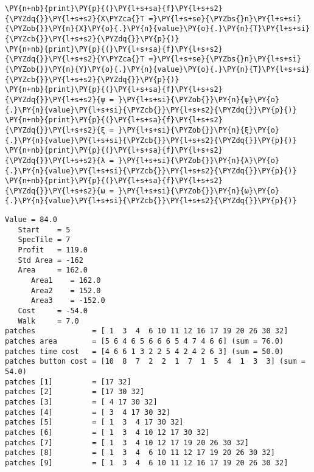 \begin{tcolorbox}[breakable, size=fbox, boxrule=1pt, pad at break*=1mm,colback=cellbackground, colframe=cellborder]
    \begin{Verbatim}[commandchars=\\\{\}]
\PY{n+nb}{print}\PY{p}{(}\PY{l+s+sa}{f}\PY{l+s+s2}{\PYZdq{}}\PY{l+s+s2}{X\PYZca{}T =}\PY{l+s+se}{\PYZbs{}n}\PY{l+s+si}{\PYZob{}}\PY{n}{X}\PY{o}{.}\PY{n}{value}\PY{o}{.}\PY{n}{T}\PY{l+s+si}{\PYZcb{}}\PY{l+s+s2}{\PYZdq{}}\PY{p}{)}
\PY{n+nb}{print}\PY{p}{(}\PY{l+s+sa}{f}\PY{l+s+s2}{\PYZdq{}}\PY{l+s+s2}{Y\PYZca{}T =}\PY{l+s+se}{\PYZbs{}n}\PY{l+s+si}{\PYZob{}}\PY{n}{Y}\PY{o}{.}\PY{n}{value}\PY{o}{.}\PY{n}{T}\PY{l+s+si}{\PYZcb{}}\PY{l+s+s2}{\PYZdq{}}\PY{p}{)}
\PY{n+nb}{print}\PY{p}{(}\PY{l+s+sa}{f}\PY{l+s+s2}{\PYZdq{}}\PY{l+s+s2}{ψ = }\PY{l+s+si}{\PYZob{}}\PY{n}{ψ}\PY{o}{.}\PY{n}{value}\PY{l+s+si}{\PYZcb{}}\PY{l+s+s2}{\PYZdq{}}\PY{p}{)}
\PY{n+nb}{print}\PY{p}{(}\PY{l+s+sa}{f}\PY{l+s+s2}{\PYZdq{}}\PY{l+s+s2}{ξ = }\PY{l+s+si}{\PYZob{}}\PY{n}{ξ}\PY{o}{.}\PY{n}{value}\PY{l+s+si}{\PYZcb{}}\PY{l+s+s2}{\PYZdq{}}\PY{p}{)}
\PY{n+nb}{print}\PY{p}{(}\PY{l+s+sa}{f}\PY{l+s+s2}{\PYZdq{}}\PY{l+s+s2}{λ = }\PY{l+s+si}{\PYZob{}}\PY{n}{λ}\PY{o}{.}\PY{n}{value}\PY{l+s+si}{\PYZcb{}}\PY{l+s+s2}{\PYZdq{}}\PY{p}{)}
\PY{n+nb}{print}\PY{p}{(}\PY{l+s+sa}{f}\PY{l+s+s2}{\PYZdq{}}\PY{l+s+s2}{ω = }\PY{l+s+si}{\PYZob{}}\PY{n}{ω}\PY{o}{.}\PY{n}{value}\PY{l+s+si}{\PYZcb{}}\PY{l+s+s2}{\PYZdq{}}\PY{p}{)}
    \end{Verbatim}
\end{tcolorbox}

\vspace*{-0.25cm}


\fontsize{8.75}{10.5}\selectfont %

\begin{Verbatim}[commandchars=\\\{\}]
Value = 84.0
   Start    = 5
   SpecTile = 7
   Profit   = 119.0
   Std Area = -162
   Area     = 162.0
      Area1    = 162.0
      Area2    = 152.0
      Area3    = -152.0
   Cost     = -54.0
   Walk     = 7.0
patches             = [ 1  3  4  6 10 11 12 16 17 19 20 26 30 32]
patches area        = [5 6 4 6 5 6 6 6 5 4 7 4 6 6] (sum = 76.0)
patches time cost   = [4 6 6 1 3 2 2 5 4 2 4 2 6 3] (sum = 50.0)
patches button cost = [10  8  7  2  2  1  7  1  5  4  1  3  3] (sum = 54.0)
patches [1]         = [17 32]
patches [2]         = [17 30 32]
patches [3]         = [ 4 17 30 32]
patches [4]         = [ 3  4 17 30 32]
patches [5]         = [ 1  3  4 17 30 32]
patches [6]         = [ 1  3  4 10 12 17 30 32]
patches [7]         = [ 1  3  4 10 12 17 19 20 26 30 32]
patches [8]         = [ 1  3  4  6 10 11 12 17 19 20 26 30 32]
patches [9]         = [ 1  3  4  6 10 11 12 16 17 19 20 26 30 32]
\end{Verbatim}

